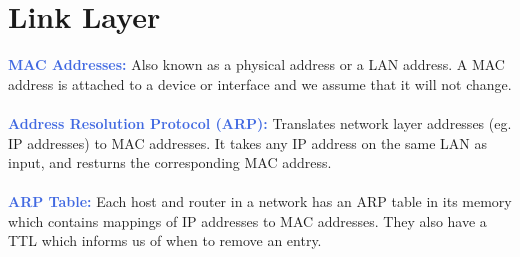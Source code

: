 \documentclass[]{article}
\begin{document}
\section{Link Layer}
\textcolor{RoyalBlue}{\textbf{MAC Addresses:}} Also known as a physical address or a LAN address. A MAC address is attached to a device or interface and we assume that it will not change. \\\\ 
\textcolor{RoyalBlue}{\textbf{Address Resolution Protocol (ARP):}} Translates network layer addresses (eg. IP addresses) to MAC addresses. It takes any IP address on the same LAN as input, and resturns the corresponding MAC address. \\\\ 
\textcolor{RoyalBlue}{\textbf{ARP Table:}} Each host and router in a network has an ARP table in its memory which contains mappings of IP addresses to MAC addresses. They also have a TTL which informs us of when to remove an entry. \\\\ 
\end{document}
